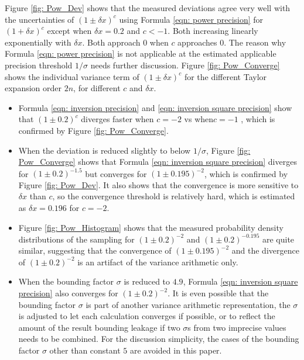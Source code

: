 \documentclass[twoside]{article}
\numberwithin{equation}{section}
\begin{document}
Figure \ref{fig: Pow_Dev} shows that the measured deviations agree very well with the uncertainties of $(1 \pm \delta x)^c$ using Formula \eqref{eqn: power precision} for $(1 + \delta x)^c$ except when $\delta x =0.2$ and $c < -1$.
Both increasing linearly exponentially with $\delta x$.
Both approach $0$ when $c$ approaches $0$.
The reason why Formula \eqref{eqn: power precision} is not applicable at the estimated applicable precision threshold $1/\sigma$ needs further discussion.
Figure \ref{fig: Pow_Converge} shows the individual variance term of $(1 \pm \delta x)^c$ for the different Taylor expansion order $2n$, for different $c$ and $\delta x$.
\begin{itemize}
\item 
Formula \eqref{eqn: inversion precision} and \eqref{eqn: inversion square precision} show that $(1 \pm 0.2)^c$ diverges faster when $c=-2$ vs when$c=-1$ , which is confirmed by Figure \ref{fig: Pow_Converge}.

\item 
When the deviation is reduced slightly to below $1/\sigma$, Figure \ref{fig: Pow_Converge} shows that Formula \eqref{eqn: inversion square precision} diverges for $(1 \pm 0.2)^{-1.5}$ but converges for $(1 \pm 0.195)^{-2}$, which is confirmed by Figure \ref{fig: Pow_Dev}.
It also shows that the convergence is more sensitive to $\delta x$ than $c$, so the convergence threshold is relatively hard, which is estimated as $\delta x = 0.196$ for $c=-2$.

\item
Figure \ref{fig: Pow_Histogram} shows that the measured probability density distributions of the sampling for $(1 \pm 0.2)^{-2}$ and  $(1 \pm 0.2)^{-0.195}$ are quite similar, suggesting that the convergence of $(1 \pm 0.195)^{-2}$ and the divergence of $(1 \pm 0.2)^{-2}$ is an artifact of the variance arithmetic only. 

\item When the bounding factor $\sigma$ is reduced to $4.9$, Formula \eqref{eqn: inversion square precision} also converges for $(1 \pm 0.2)^{-2}$.
It is even possible that the bounding factor $\sigma$ is part of another variance arithmetic representation, the  $\sigma$ is adjusted to let each calculation converges if possible, or to reflect the amount of the result bounding leakage if two $\sigma$s from two imprecise values needs to be combined.
For the discussion simplicity, the cases of the bounding factor $\sigma$ other than constant $5$ are avoided in this paper.
\end{itemize}
\end{document}
